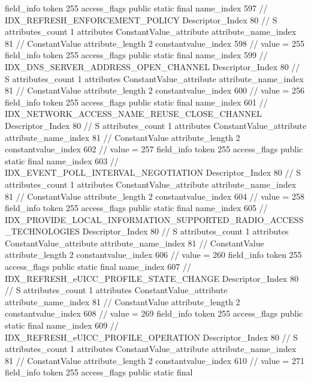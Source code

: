 {{{{			field_info {
				token	255
				access_flags	public static final
				name_index	597		// IDX_REFRESH_ENFORCEMENT_POLICY
				Descriptor_Index	80		// S
				attributes_count	1
				attributes {
				ConstantValue_attribute {
					attribute_name_index	81		// ConstantValue
					attribute_length	2
					constantvalue_index	598		// value = 255
				}
				}
			}
			field_info {
				token	255
				access_flags	public static final
				name_index	599		// IDX_DNS_SERVER_ADDRESS_OPEN_CHANNEL
				Descriptor_Index	80		// S
				attributes_count	1
				attributes {
				ConstantValue_attribute {
					attribute_name_index	81		// ConstantValue
					attribute_length	2
					constantvalue_index	600		// value = 256
				}
				}
			}
			field_info {
				token	255
				access_flags	public static final
				name_index	601		// IDX_NETWORK_ACCESS_NAME_REUSE_CLOSE_CHANNEL
				Descriptor_Index	80		// S
				attributes_count	1
				attributes {
				ConstantValue_attribute {
					attribute_name_index	81		// ConstantValue
					attribute_length	2
					constantvalue_index	602		// value = 257
				}
				}
			}
			field_info {
				token	255
				access_flags	public static final
				name_index	603		// IDX_EVENT_POLL_INTERVAL_NEGOTIATION
				Descriptor_Index	80		// S
				attributes_count	1
				attributes {
				ConstantValue_attribute {
					attribute_name_index	81		// ConstantValue
					attribute_length	2
					constantvalue_index	604		// value = 258
				}
				}
			}
			field_info {
				token	255
				access_flags	public static final
				name_index	605		// IDX_PROVIDE_LOCAL_INFORMATION_SUPPORTED_RADIO_ACCESS_TECHNOLOGIES
				Descriptor_Index	80		// S
				attributes_count	1
				attributes {
				ConstantValue_attribute {
					attribute_name_index	81		// ConstantValue
					attribute_length	2
					constantvalue_index	606		// value = 260
				}
				}
			}
			field_info {
				token	255
				access_flags	public static final
				name_index	607		// IDX_REFRESH_eUICC_PROFILE_STATE_CHANGE
				Descriptor_Index	80		// S
				attributes_count	1
				attributes {
				ConstantValue_attribute {
					attribute_name_index	81		// ConstantValue
					attribute_length	2
					constantvalue_index	608		// value = 269
				}
				}
			}
			field_info {
				token	255
				access_flags	public static final
				name_index	609		// IDX_REFRESH_eUICC_PROFILE_OPERATION
				Descriptor_Index	80		// S
				attributes_count	1
				attributes {
				ConstantValue_attribute {
					attribute_name_index	81		// ConstantValue
					attribute_length	2
					constantvalue_index	610		// value = 271
				}
				}
			}
			field_info {
				token	255
				access_flags	public static final
}}}}}
